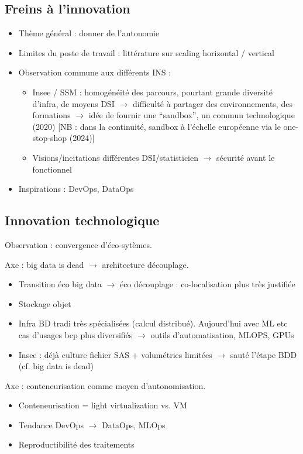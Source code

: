 \subsection{Freins à l'innovation}
\begin{itemize}
    \item Thème général : donner de l'autonomie
    \item Limites du poste de travail : littérature sur scaling horizontal / vertical
    \item Observation commune aux différents INS :
    \begin{itemize}
        \item Insee / SSM : homogénéité des parcours, pourtant grande diversité d'infra, de moyens DSI $\rightarrow$ difficulté à partager des environnements, des formations $\rightarrow$ idée de fournir une ``sandbox'', un commun technologique (2020) [NB : dans la continuité, sandbox à l'échelle européenne via le one-stop-shop (2024)]
        \item Visions/incitations différentes DSI/statisticien $\rightarrow$ sécurité avant le fonctionnel
    \end{itemize}
    \item Inspirations : DevOps, DataOps
\end{itemize}

\subsection{Innovation technologique}
Observation : convergence d'éco-sytèmes.

Axe : big data is dead $\rightarrow$ architecture découplage.
\begin{itemize}
    \item Transition éco big data $\rightarrow$ éco découplage : co-localisation plus très justifiée
    \item Stockage objet
    \item Infra BD tradi très spécialisées (calcul distribué). Aujourd'hui avec ML etc cas d'usages bcp plus diversifiés $\rightarrow$ outils d'automatisation, MLOPS, GPUs
    \item Insee : déjà culture fichier SAS + volumétries limitées $\rightarrow$ sauté l'étape BDD (cf. big data is dead)
\end{itemize}

Axe : conteneurisation comme moyen d'autonomisation.
\begin{itemize}
    \item Conteneurisation = light virtualization vs. VM
    \item Tendance DevOps $\rightarrow$ DataOps, MLOps
    \item Reproductibilité des traitements
\end{itemize}